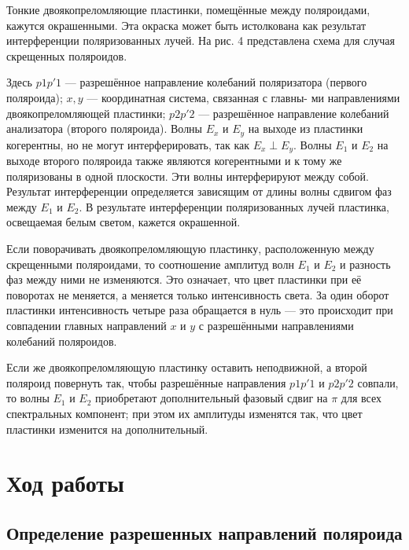 \documentclass[a4paper,12pt]{article}
\begin{document}
Тонкие двоякопреломляющие пластинки, помещённые между поляроидами, кажутся окрашенными. Эта окраска может быть истолкована как результат интерференции поляризованных лучей. На рис. 4 представлена схема для
случая скрещенных поляроидов.

Здесь $ p1p'1 $ --- разрешённое направление колебаний поляризатора
(первого поляроида); $ x, y $ --- координатная система, связанная с главны-
ми направлениями двоякопреломляющей пластинки; $ p2p'2 $ --- разрешённое направление колебаний анализатора (второго поляроида). Волны
$ E_x  $ и $ E_y $ на выходе из пластинки когерентны, но не могут интерферировать, так как $ E_x \perp  E_y $. Волны $ E_1 $ и $ E_2 $ на выходе второго поляроида
также являются когерентными и к тому же поляризованы в одной плоскости. Эти волны интерферируют между собой. Результат интерференции определяется зависящим от длины волны сдвигом фаз между $ E_1 $
и $ E_2 $. В результате интерференции поляризованных лучей пластинка, освещаемая белым светом, кажется окрашенной.

Если поворачивать двоякопреломляющую пластинку, расположенную между
скрещенными поляроидами, то соотношение амплитуд волн $ E_1 $ и $ E_2 $ и разность фаз между ними не изменяются. Это означает, что цвет пластинки при её поворотах не меняется, а меняется только интенсивность света. За один оборот пластинки интенсивность четыре раза обращается в нуль --- это происходит при совпадении главных направлений
$ x $ и $ y $ с разрешёнными направлениями колебаний поляроидов.

Если же двоякопреломляющую пластинку оставить неподвижной, а
второй поляроид повернуть так, чтобы разрешённые направления $ p1p'1 $
и $ p2p'2 $ совпали, то волны $ E_1 $ и $ E_2 $ приобретают дополнительный фазовый сдвиг на $ \pi $ для всех спектральных компонент; при этом их амплитуды изменятся так, что цвет пластинки изменится на дополнительный. 

\section{Ход работы}

\subsection{Определение разрешенных направлений поляроида}
\end{document}
